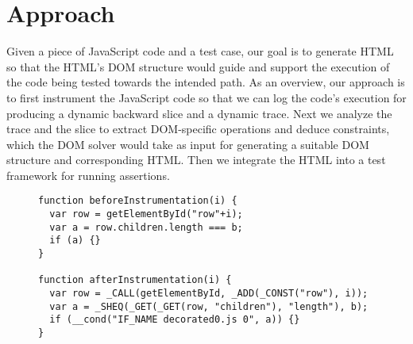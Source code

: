 \section{Approach}
Given a piece of JavaScript code and a test case, our goal is to generate HTML so that the HTML's DOM structure would guide and support the execution of the code being tested towards the intended path.  
As an overview, our approach is to first instrument the JavaScript code so that we can log the code's execution for producing a dynamic backward slice and a dynamic trace.  
Next we analyze the trace and the slice to extract DOM-specific operations and deduce constraints, which the DOM solver would take as input for generating a suitable DOM structure and corresponding HTML.  
Then we integrate the HTML into a test framework for running assertions.  


\begin{figure}
\begin{lstlisting}[caption=Example showing how code is instrumented for dynamic analysis.,label=sheq]  
function beforeInstrumentation(i) {
  var row = getElementById("row"+i);
  var a = row.children.length === b; 
  if (a) {}
}

function afterInstrumentation(i) {
  var row = _CALL(getElementById, _ADD(_CONST("row"), i));
  var a = _SHEQ(_GET(_GET(row, "children"), "length"), b);
  if (__cond("IF_NAME decorated0.js 0", a)) {}
}
\end{lstlisting}
\end{figure}

